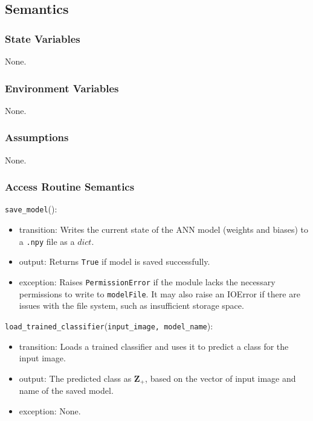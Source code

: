 \documentclass[12pt, titlepage]{article}
\def\code#1{\texttt{#1}}
\begin{document}
\subsection{Semantics}

\subsubsection{State Variables}
None.

\subsubsection{Environment Variables}
None.

\subsubsection{Assumptions}
None.

\subsubsection{Access Routine Semantics}

\noindent \code{save\_model}():
\begin{itemize}
  \item transition: Writes the current state of the ANN model (weights and biases) to a \code{.npy} file 
  as a $dict$.
  \item output: Returns \code{True} if model is saved successfully.
  \item exception: Raises \code{PermissionError} if the module lacks the necessary permissions to write to \code{modelFile}. 
  It may also raise an IOError if there are issues with the file system, such as insufficient storage space.
\end{itemize}

\noindent \code{load\_trained\_classifier}(\code{input\_image, model\_name}):
\begin{itemize}
  \item transition: Loads a trained classifier and uses it to predict a class for the input image. 
  \item output: The predicted class as $\mathbf{Z}_{+}$, based on the vector of input image and 
  name of the saved model.
  \item exception: None.
\end{itemize}
\end{document}
